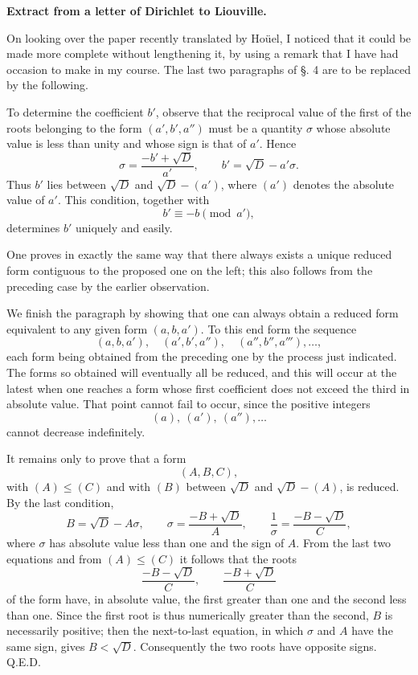 \documentclass[11pt]{article}
\begin{document}
\begin{center}
\textbf{Extract from a letter of Dirichlet to Liouville.}
\end{center}

On looking over the paper recently translated by Hoüel, I noticed that it could be made more complete without lengthening it, by using a remark that I have had occasion to make in my course. The last two paragraphs of \S. 4 are to be replaced by the following.

To determine the coefficient $b'$, observe that the reciprocal value of the first of the roots belonging to the form $(a',b',a'')$ must be a quantity $\sigma$ whose absolute value is less than unity and whose sign is that of $a'$. Hence
\[
  \sigma=\frac{-b'+\sqrt D}{a'},\qquad
  b'=\sqrt D-a'\sigma.
\]
Thus $b'$ lies between $\sqrt D$ and $\sqrt D-(a')$, where $(a')$ denotes the absolute value of $a'$. This condition, together with
\[
  b'\equiv-b\pmod {a'},
\]
determines $b'$ uniquely and easily.

One proves in exactly the same way that there always exists a unique reduced form contiguous to the proposed one on the left; this also follows from the preceding case by the earlier observation.

We finish the paragraph by showing that one can always obtain a reduced form equivalent to any given form $(a,b,a')$. To this end form the sequence
\[
 (a,b,a'),\quad (a',b',a''),\quad (a'',b'',a'''),\ldots,
\]
each form being obtained from the preceding one by the process just indicated. The forms so obtained will eventually all be reduced, and this will occur at the latest when one reaches a form whose first coefficient does not exceed the third in absolute value. That point cannot fail to occur, since the positive integers
\[
 (a),\ (a'),\ (a''),\ldots
\]
cannot decrease indefinitely.

It remains only to prove that a form
\[
  (A,B,C),
\]
with $(A)\leq(C)$ and with $(B)$ between $\sqrt D$ and $\sqrt D-(A)$, is reduced. By the last condition,
\[
  B=\sqrt D-A\sigma,
  \qquad
  \sigma=\frac{-B+\sqrt D}{A},
  \qquad
  \frac1\sigma=\frac{-B-\sqrt D}{C},
\]
where $\sigma$ has absolute value less than one and the sign of $A$. From the last two equations and from $(A)\leq(C)$ it follows that the roots
\[
  \frac{-B-\sqrt D}{C},\qquad
  \frac{-B+\sqrt D}{C}
\]
of the form have, in absolute value, the first greater than one and the second less than one. Since the first root is thus numerically greater than the second, $B$ is necessarily positive; then the next-to-last equation, in which $\sigma$ and $A$ have the same sign, gives $B<\sqrt D$. Consequently the two roots have opposite signs. Q.E.D.
\end{document}
